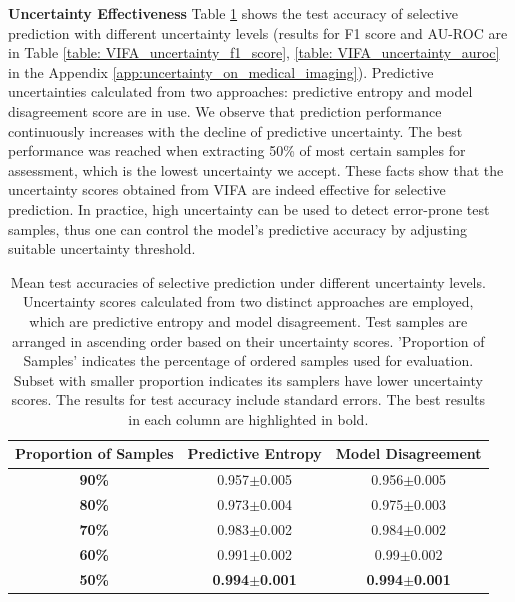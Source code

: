 \documentclass[10pt]{article} %
\begin{document}
\textbf{Uncertainty Effectiveness} Table \ref{table: VIFA_uncertainty_acc} shows the test accuracy of selective prediction with different uncertainty levels (results for F1 score and AU-ROC are in Table \ref{table: VIFA_uncertainty_f1_score}, \ref{table: VIFA_uncertainty_auroc} in the Appendix \ref{app:uncertainty_on_medical_imaging}). Predictive uncertainties calculated from two approaches: predictive entropy and model disagreement score are in use. We observe that prediction performance continuously increases with the decline of predictive uncertainty. The best performance was reached when extracting 50\% of most certain samples for assessment, which is the lowest uncertainty we accept. These facts show that the uncertainty scores obtained from VIFA are indeed effective for selective prediction. In practice, high uncertainty can be used to detect error-prone test samples, thus one can control the model's predictive accuracy by adjusting suitable uncertainty threshold. 


\begin{table}[!htp]
\caption{Mean test accuracies of selective prediction under different uncertainty levels. Uncertainty scores calculated from two distinct approaches are employed, which are predictive entropy and model disagreement. Test samples are arranged in ascending order based on their uncertainty scores. 'Proportion of Samples' indicates the percentage of ordered samples used for evaluation. Subset with smaller proportion indicates its samplers have lower uncertainty scores. The results for test accuracy include standard errors. The best results in each column are highlighted in bold.}
\label{table: VIFA_uncertainty_acc}
\begin{center}
\begin{tabular}{c|cc}
\textbf{Proportion of Samples} & \textbf{Predictive Entropy} & \textbf{Model Disagreement} \\ \hline
\textbf{90\%}                               & 0.957$\pm$0.005                 & 0.956$\pm$0.005                 \\
\textbf{80\%}                               & 0.973$\pm$0.004                 & 0.975$\pm$0.003                 \\
\textbf{70\%}                               & 0.983$\pm$0.002                 & 0.984$\pm$0.002                 \\
\textbf{60\%}                               & 0.991$\pm$0.002                 & 0.99$\pm$0.002                  \\
\textbf{50\%}                               & \textbf{0.994$\pm$0.001}                 & \textbf{0.994$\pm$0.001}        
\end{tabular}
\end{center}
\end{table}
\end{document}
